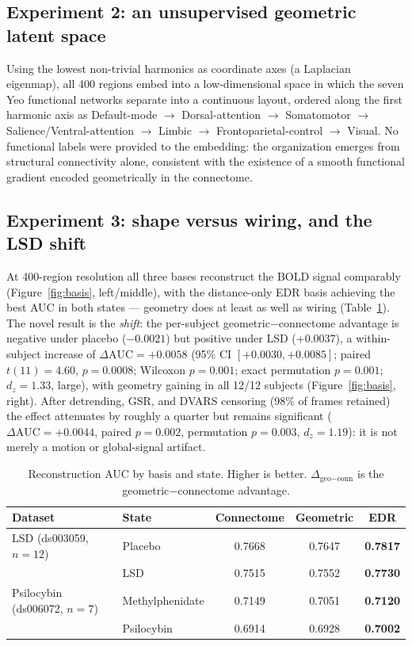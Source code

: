 \documentclass[10pt,a4paper]{article}
\begin{document}
\subsection{Experiment 2: an unsupervised geometric latent space}
Using the lowest non-trivial harmonics as coordinate axes (a Laplacian
eigenmap), all 400 regions embed into a low-dimensional space in which the seven
Yeo functional networks separate into a continuous layout, ordered along the
first harmonic axis as Default-mode $\rightarrow$ Dorsal-attention
$\rightarrow$ Somatomotor $\rightarrow$ Salience/Ventral-attention $\rightarrow$
Limbic $\rightarrow$ Frontoparietal-control $\rightarrow$ Visual. No functional
labels were provided to the embedding: the organization emerges from structural
connectivity alone, consistent with the existence of a smooth functional gradient
encoded geometrically in the connectome.

\subsection{Experiment 3: shape versus wiring, and the LSD shift}
At 400-region resolution all three bases reconstruct the BOLD signal comparably
(Figure~\ref{fig:basis}, left/middle), with the distance-only EDR basis achieving
the best AUC in both states --- geometry does at least as well as wiring
(Table~\ref{tab:auc}). The novel result is the \emph{shift}: the per-subject
geometric$-$connectome advantage is negative under placebo ($-0.0021$) but
positive under LSD ($+0.0037$), a within-subject increase of
$\Delta\mathrm{AUC}=+0.0058$ (95\% CI $[+0.0030,+0.0085]$; paired $t(11)=4.60$,
$p=0.0008$; Wilcoxon $p=0.001$; exact permutation $p=0.001$; $d_z=1.33$, large),
with geometry gaining in all 12/12 subjects (Figure~\ref{fig:basis}, right).
After detrending, GSR, and DVARS censoring (98\% of frames retained) the effect
attenuates by roughly a quarter but remains significant
($\Delta\mathrm{AUC}=+0.0044$, paired $p=0.002$, permutation $p=0.003$,
$d_z=1.19$): it is not merely a motion or global-signal artifact.

\begin{table}[t]
  \centering
  \small
  \caption{Reconstruction AUC by basis and state. Higher is better.
  $\Delta_{\text{geo}-\text{conn}}$ is the geometric$-$connectome advantage.}
  \label{tab:auc}
  \begin{tabular}{llccc}
    \toprule
    Dataset & State & Connectome & Geometric & EDR \\
    \midrule
    LSD (ds003059, $n{=}12$) & Placebo & 0.7668 & 0.7647 & \textbf{0.7817} \\
                             & LSD     & 0.7515 & 0.7552 & \textbf{0.7730} \\
    \midrule
    Psilocybin (ds006072, $n{=}7$) & Methylphenidate & 0.7149 & 0.7051 & \textbf{0.7120} \\
                                   & Psilocybin      & 0.6914 & 0.6928 & \textbf{0.7002} \\
    \bottomrule
  \end{tabular}
\end{table}
\end{document}
